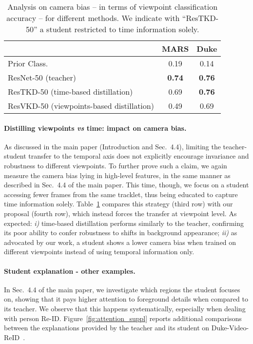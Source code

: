 \documentclass[runningheads]{llncs}
\newcommand{\nicepar}[1]{\paragraph{\normalfont\textbf{#1}}}
\newcommand{\mars}{MARS}
\newcommand{\duke}{Duke}
\newcommand{\dukefull}{Duke-Video-ReID}
\newcommand{\resnet}[1]{ResNet-#1}
\newcommand{\tea}[1]{\resnet{#1}}
\newcommand{\stf}[1]{ResVKD-#1}
\newcommand{\quotationmarks}[1]{``#1''}
\begin{document}
\begin{table}[b]
    \centering
    \caption{Analysis on camera bias -- in terms of viewpoint classification accuracy -- for different methods. We indicate with \quotationmarks{ResTKD-50} a student restricted to time information solely.}
    \label{tab:biastimevsmv}
    \setlength{\tabcolsep}{5pt}
    \begin{tabular}{l|c|c}
    \hline
    \multirow{2}{*}{} & \multicolumn{1}{c|}{\mars{}} & \multicolumn{1}{c}{\duke{}}\\
    \hline
    Prior Class. & 0.19 & 0.14 \\
    \hline\hline
    \tea{50} (teacher) & \textbf{0.74} & \textbf{0.76}\\
    ResTKD-50 (time-based distillation) & 0.69 & \textbf{0.76}\\
    \stf{50} (viewpoints-based distillation) & 0.49 & 0.69 \\
    \hline
    \end{tabular}
\end{table}
\nicepar{Distilling viewpoints \textit{vs} time: impact on camera bias.} As discussed in the main paper (Introduction and Sec.~4.4), limiting the teacher-student transfer to the temporal axis does not explicitly encourage invariance and robustness to different viewpoints. To further prove such a claim, we again measure the camera bias lying in high-level features, in the same manner as described in Sec.~4.4 of the main paper. This time, though, we focus on a student accessing fewer frames from the same tracklet, thus being educated to capture time information solely. Table~\ref{tab:biastimevsmv} compares this strategy (third row) with our proposal (fourth row), which instead forces the transfer at viewpoint level. As expected: \textit{i)} time-based distillation performs similarly to the teacher, confirming its poor ability to confer robustness to shifts in background appearance; \textit{ii)} as advocated by our work, a student shows a lower camera bias when trained on different viewpoints instead of using temporal information only.
\nicepar{Student explanation - other examples.} In Sec.~4.4 of the main paper, we investigate which regions the student focuses on, showing that it pays higher attention to foreground details when compared to its teacher. We observe that this happens systematically, especially when dealing with person Re-ID. Figure~\ref{fig:attention_suppl} reports additional comparisons between the explanations provided by the teacher and its student on \dukefull{}~\cite{wu2018duke1}.
\end{document}

